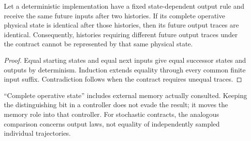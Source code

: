 \begin{proposition}\label{prop:memorynecessity}
Let a deterministic implementation have a fixed state-dependent output rule and receive the same future inputs after two histories. If its complete operative physical state is identical after those histories, then its future output traces are identical. Consequently, histories requiring different future output traces under the contract cannot be represented by that same physical state.
\end{proposition}
\begin{proof}
Equal starting states and equal next inputs give equal successor states and outputs by determinism. Induction extends equality through every common finite input suffix. Contradiction follows when the contract requires unequal traces.
\end{proof}
``Complete operative state'' includes external memory actually consulted. Keeping the distinguishing bit in a controller does not evade the result; it moves the memory role into that controller. For stochastic contracts, the analogous comparison concerns output laws, not equality of independently sampled individual trajectories.
